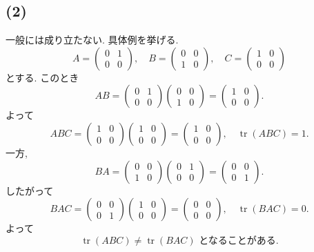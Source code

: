 \documentclass[uplatex,dvipdfmx,a4paper,14pt]{jsarticle}
\newcommand{\tr}{\operatorname{tr}}
\begin{document}
\subsection*{(2)}
一般には成り立たない. 具体例を挙げる.
\[
A=\begin{pmatrix}0&1\\0&0\end{pmatrix},\quad
B=\begin{pmatrix}0&0\\1&0\end{pmatrix},\quad
C=\begin{pmatrix}1&0\\0&0\end{pmatrix}
\]
とする. このとき
\[
AB=
\begin{pmatrix}0&1\\0&0\end{pmatrix}
\begin{pmatrix}0&0\\1&0\end{pmatrix}
=
\begin{pmatrix}1&0\\0&0\end{pmatrix}.
\]
よって
\[
ABC=
\begin{pmatrix}1&0\\0&0\end{pmatrix}
\begin{pmatrix}1&0\\0&0\end{pmatrix}
=
\begin{pmatrix}1&0\\0&0\end{pmatrix},
\quad
\tr(ABC)=1.
\]
一方,
\[
BA=
\begin{pmatrix}0&0\\1&0\end{pmatrix}
\begin{pmatrix}0&1\\0&0\end{pmatrix}
=
\begin{pmatrix}0&0\\0&1\end{pmatrix}.
\]
したがって
\[
BAC=
\begin{pmatrix}0&0\\0&1\end{pmatrix}
\begin{pmatrix}1&0\\0&0\end{pmatrix}
=
\begin{pmatrix}0&0\\0&0\end{pmatrix},
\quad
\tr(BAC)=0.
\]
よって
\[
\boxed{\tr(ABC)\ne \tr(BAC)\text{ となることがある}.}
\]
\end{document}
